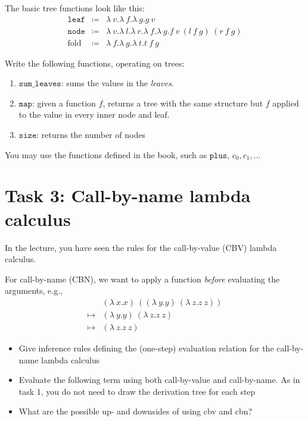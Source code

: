 The basic tree functions look like this:
\begin{align*}
  \mathtt{leaf} & \coloneq & \lambda\ v.\lambda\ f.\lambda\ g.g\ v \\
  \mathtt{node} & \coloneq & \lambda\ v.\lambda\ l.\lambda\ r.\lambda\ f.\lambda\ g.f\ v\ (l\ f\ g)\ (r\ f\ g) \\
  \mathrm{fold} & \coloneq & \lambda\ f.\lambda\ g.\lambda\ t.t\ f\ g
\end{align*}

Write the following functions, operating on trees:
\begin{enumerate}
  \item $\mathtt{sum\_leaves}$: sums the values in the \emph{leaves}.
  \item $\mathtt{map}$: given a function $f$, returns a tree with the same structure but $f$ applied to the value in every inner node and leaf.
  \item $\mathtt{size}$: returns the number of nodes
\end{enumerate}

You may use the functions defined in the book, such as $\mathtt{plus}$, $c_0,c_1,\dots$

\section*{Task 3: Call-by-name lambda calculus}

In the lecture, you have seen the rules for the call-by-value (CBV) lambda calculus.

For call-by-name (CBN), we want to apply a function \emph{before} evaluating the arguments, e.g.,
\begin{align*}
  & (\lambda\ x.x)\ ((\lambda\ y.y)\ (\lambda\ z.z\ z)) \\
  \mapsto & (\lambda\ y.y)\ (\lambda\ z.z\ z)\\
  \mapsto & (\lambda\ z.z\ z)
\end{align*}

\begin{itemize}
  \item Give inference rules defining the (one-step) evaluation relation for the call-by-name lambda calculus
  \item Evaluate the following term using both call-by-value and call-by-name. As in task 1, you do not need to draw the derivation tree for each step
  \item What are the possible up- and downsides of using cbv and cbn?
\end{itemize}

